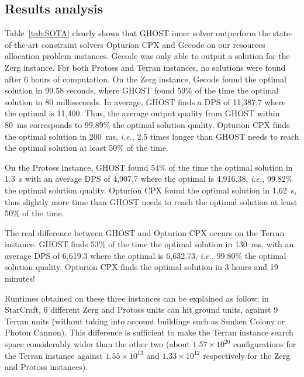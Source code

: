 \documentclass[journal]{IEEEtran}
\newcommand{\ghost}{\textsc{GHOST}\xspace}
\newcommand{\ie}{\textit{i.e.}}
\begin{document}
\subsection{Results analysis}

Table~\ref{tab:SOTA} clearly shows that \ghost inner solver outperform
the state-of-the-art constraint solvers Opturion CPX and Gecode on our
resources allocation problem instances. Gecode was only able to output
a  solution  for  the  Zerg  instance. For  both  Protoss  and  Terran
instances, no  solutions were found  after 6 hours of  computation. On
the Zerg instance, Gecode found the optimal solution in 99.58 seconds,
where  \ghost found  59\%  of  the time  the  optimal  solution in  80
milliseconds.  In  average, \ghost  finds a DPS  of 11,387.7  where the
optimal is 11,400. Thus, the average output quality from \ghost within
80~ms corresponds to 99.89\% the optimal solution quality. Opturion CPX
finds  the optimal  solution  in  200~ms, \ie,  2.5  times longer than  \ghost
needs to reach the optimal solution at least 50\% of the time.

On the  Protoss instance, \ghost  found 54\%  of the time  the optimal
solution  in 1.3~s with  an average  DPS of  4,907.7 where  the
optimal   is    4,916.38,   \ie,   99.82\%   the    optimal   solution
quality.  Opturion  CPX  found  the optimal  solution  in  1.62~s,  thus
slightly more time  than \ghost needs to reach the  optimal solution at
least 50\% of the time.

The  real difference  between \ghost  and Opturion  CPX occurs  on the
Terran  instance. \ghost finds  53\% of  the time  the optimal
solution in 130~ms, with an average DPS of 6,619.3 where the
optimal  is  6,632.73,  \ie,  99.80\% the  optimal  solution  quality.
Opturion CPX finds the optimal solution in 3 hours and 19 minutes!

Runtimes obtained on these three instances can be explained as follow:
in StarCraft, 6 different Zerg and Protoss units can hit ground units,
against 9 Terran units (without taking into account buildings
such  as  Sunken  Colony  or   Photon  Cannon).   This  difference  is
sufficient to make the Terran instance search space considerably wider
than the  other two (about  $1.57 \times 10^{20}$  configurations for
the Terran  instance against  $1.55 \times  10^{13}$ and  $1.33 \times
10^{12}$ respectively for the Zerg and Protoss instances).
\end{document}
